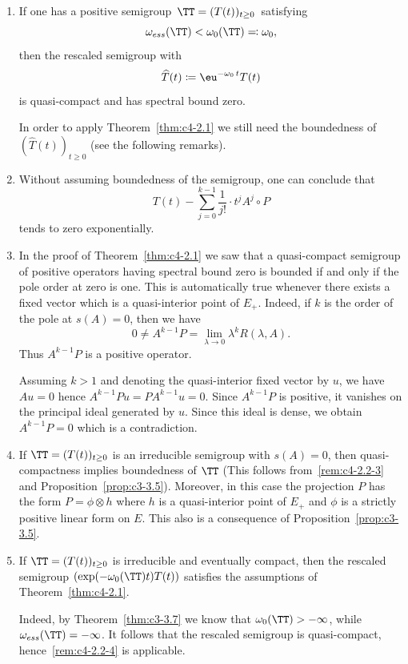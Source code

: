 \begin{remarks}\label{rem:c4-2.2}
\begin{enumerate}[\upshape (i), wide, labelindent=.25em]

\item \label{rem:c4-2.2-1}
If one has a positive semigroup\, $\TT = (T(t))_{t \geq 0}$\,  satisfying
\[
\omega_{ess}(\TT) <  \omega_0(\TT) \eqqcolon \omega_0, 
\]
then the rescaled semigroup with 
\[
\widehat{T}(t) \coloneqq \eu^{-\omega_0 \, t }T(t)
\]
is quasi-compact and has spectral bound zero.

In order to apply Theorem~\ref{thm:c4-2.1} we still need the boundedness of\/ $(\widehat{T}(t))_{t\geq 0}$ (see the following remarks).

\item \label{rem:c4-2.2-2}
Without assuming boundedness of the semigroup, one can conclude that
\[
T(t) - \sum_{j=0}^{k-1} \frac{1}{j!} \cdot t^{j}A^{j}{\circ}P
\]
tends to zero exponentially.

\item \label{rem:c4-2.2-3}
In the proof of Theorem~\ref{thm:c4-2.1} we saw that a quasi-compact semigroup of positive operators having spectral bound zero is bounded if and only if the pole order at zero is one.
This is automatically true whenever there exists a fixed vector which is a quasi-interior point of\/ $E_{+}$.
Indeed, if\/ $k$ is the order of the pole at $s(A) = 0$, then we have 
\[
0 \neq A^{k-1}P = \lim_{\lambda \to 0} \lambda^{k}R(\lambda,A).
\]
Thus $A^{k-1}P$ is a positive operator.

Assuming $k > 1$ and denoting the quasi-interior fixed vector by $u$, we have $Au = 0$ hence $A^{k-1}Pu = PA^{k-1}u = 0$.
Since $A^{k-1}P$ is positive, it vanishes on the principal ideal generated by $u$.
Since this ideal is dense, we obtain $A^{k-1}P = 0$ which is a contradiction.

\item  \label{rem:c4-2.2-4}
If\/ $\TT = (T(t))_{t \geq 0}$ is an irreducible semigroup with $s(A) = 0$, then quasi-compactness implies boundedness of\/ $\TT$ (This follows from~\ref{rem:c4-2.2-3} and Proposition~\ref{prop:c3-3.5}).
Moreover, in this case the projection $P$ has the form $P = \phi \otimes h$ where $h$ 
is a quasi-interior point of\/ $E_{+}$ and $\phi$ is a strictly positive linear form on $E$.
This also is a consequence of Proposition~\ref{prop:c3-3.5}.

\item  \label{rem:c4-2.2-5}
If\/ $\TT = (T(t))_{t \geq 0}$ is irreducible and eventually compact, then the rescaled semigroup $(\exp(-\omega_0(\TT)t)T(t))$ satisfies the assumptions of Theorem~\ref{thm:c4-2.1}.

Indeed, by Theorem~\ref{thm:c3-3.7} we know that $\omega_0(\TT) > -\infty$, while $\omega_{ess}(\TT) = -\infty$.
It follows that the rescaled semigroup is quasi-compact, hence~\ref{rem:c4-2.2-4} is applicable.
\end{enumerate}
\end{remarks}

